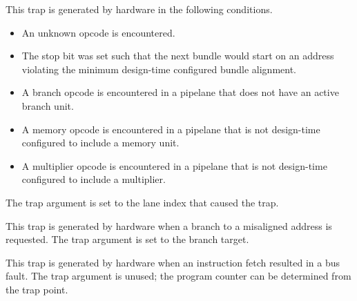 


This trap is generated by hardware in the following conditions.

\begin{itemize}

\item An unknown opcode is encountered.

\item The stop bit was set such that the next bundle would start on an address
violating the minimum design-time configured bundle alignment.

\item A branch opcode is encountered in a pipelane that does not have an active
branch unit.

\item A memory opcode is encountered in a pipelane that is not design-time
configured to include a memory unit.

\item A multiplier opcode is encountered in a pipelane that is not design-time
configured to include a multiplier.

\end{itemize}

\noindent The trap argument is set to the lane index that caused the trap.



This trap is generated by hardware when a branch to a misaligned address is
requested. The trap argument is set to the branch target.



This trap is generated by hardware when an instruction fetch resulted in a bus
fault. The trap argument is unused; the program counter can be determined from
the trap point.


